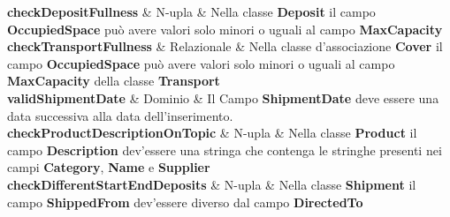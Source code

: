 {  \textbf{checkDepositFullness} & N-upla & 
  {\footnotesize
  Nella classe \textbf{Deposit} il campo \textbf{OccupiedSpace} può avere valori solo minori o uguali al campo \textbf{MaxCapacity}
  }\\
  
  \textbf{checkTransportFullness} & Relazionale & %
  {\footnotesize
  Nella classe d'associazione \textbf{Cover} il campo \textbf{OccupiedSpace} può avere valori solo minori o uguali al campo \textbf{MaxCapacity} della classe \textbf{Transport}
  }\\
  
  \textbf{validShipmentDate} & Dominio & 
  {\footnotesize
  Il Campo \textbf{ShipmentDate} deve essere una data successiva alla data dell'inserimento.
  }\\

  \textbf{checkProductDescriptionOnTopic} & N-upla &
  {\footnotesize
  Nella classe \textbf{Product} il campo \textbf{Description} dev'essere una stringa che contenga le stringhe presenti nei campi \textbf{Category}, \textbf{Name} e \textbf{Supplier}
  }\\

  \textbf{checkDifferentStartEndDeposits} & N-upla &
  {\footnotesize
  Nella classe \textbf{Shipment} il campo \textbf{ShippedFrom} dev'essere diverso dal campo \textbf{DirectedTo}
  }\\
  
}

